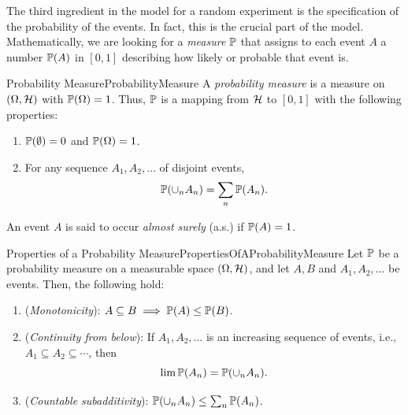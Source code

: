 The third ingredient in the model for a random experiment is the specification of the probability of the events. In fact, this is the crucial part of the model. Mathematically, we are looking for a \textit{measure} \(\mathbb{P}\) that assigns to each event \(A\) a number \(\mathbb{P}(A)\) in \([0, 1]\) describing how likely or probable that event is.

\begin{defn}{Probability Measure}{ProbabilityMeasure}
	A \textit{probability measure} is a measure on $(\Omega, \mathcal{H})$ with $\mathbb{P}(\Omega) = 1$. Thus, $\mathbb{P}$ is a mapping from $\mathcal{H}$ to $[0, 1]$ with the following properties:
	\begin{enumerate}
		\item $\mathbb{P}(\emptyset) = 0$ and $\mathbb{P}(\Omega) = 1$.
		\item For any sequence $A_1, A_2, \dots$ of disjoint events,
		      \begin{equation}
			      \mathbb{P}(\cup_n A_n) = \sum_n \mathbb{P}(A_n).
			      \label{eq:ProbabilityMeasureDef}
		      \end{equation}
	\end{enumerate}
\end{defn}

An event \(A\) is said to occur \textit{almost surely} (a.s.) if \(\mathbb{P}(A) = 1\).

\begin{thm}{Properties of a Probability Measure}{PropertiesOfAProbabilityMeasure}
	Let $\mathbb{P}$ be a probability measure on a measurable space $(\Omega, \mathcal{H})$, and let $A, B$ and $A_1, A_2, \dots$ be events. Then, the following hold:
	\begin{enumerate}
		\item (\textit{Monotonicity}): $A \subseteq B \implies \mathbb{P}(A) \le \mathbb{P}(B)$.
		\item (\textit{Continuity from below}): If $A_1, A_2, \dots$ is an increasing sequence of events, i.e., $A_1 \subseteq A_2 \subseteq \cdots$, then
		      \begin{equation}
			      \lim \mathbb{P}(A_n) = \mathbb{P}(\cup_n A_n).
			      \label{eq:ContinuityFromBelow}
		      \end{equation}
		\item (\textit{Countable subadditivity}): $\mathbb{P}(\cup_n A_n) \le \sum_n \mathbb{P}(A_n)$.
	\end{enumerate}
\end{thm}

